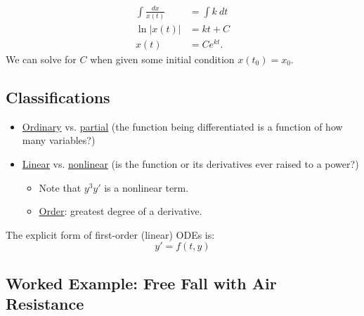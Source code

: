 \documentclass{article}
\begin{document}

        
\begin{align*}
\int \frac{dx}{x( t)} & =\int k\ dt\\
\ln |x( t) | & =kt+C\\
x( t) & =Ce^{kt}.
\end{align*}
We can solve for $\displaystyle C$ when given some initial condition $\displaystyle x( t_{0}) =x_{0}$.


\subsection{Classifications}
\begin{itemize}
\item \underline{Ordinary} vs. \underline{partial} (the function being differentiated is a function of how many variables?)
\item \underline{Linear} vs. \underline{nonlinear} (is the function or its derivatives ever raised to a power?)
\begin{itemize}
    \item Note that $y^3y'$ is a nonlinear term.
    \item \underline{Order}: greatest degree of a derivative.
\end{itemize}
\end{itemize}

The explicit form of first-order (linear) ODEs is:
\begin{equation}
    \boxed{y'=f(t,y)}
\end{equation}


\subsection{Worked Example: Free Fall with Air Resistance}
\end{document}
